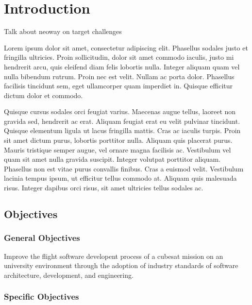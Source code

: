 \chapter{Introduction} \label{cha:introduction}

\fancyhead[ER]{\sffamily\footnotesize{\leftmark}}
\fancyhead[OL]{\sffamily\footnotesize{\rightmark}}

Talk about neoway on target challenges

Lorem ipsum dolor sit amet, consectetur adipiscing elit. Phasellus sodales justo et fringilla ultricies. Proin sollicitudin, dolor sit amet commodo iaculis, justo mi hendrerit arcu, quis eleifend diam felis lobortis nulla. Integer aliquam quam vel nulla bibendum rutrum. Proin nec est velit. Nullam ac porta dolor. Phasellus facilisis tincidunt sem, eget ullamcorper quam imperdiet in. Quisque efficitur dictum dolor et commodo.

Quisque cursus sodales orci feugiat varius. Maecenas augue tellus, laoreet non gravida sed, hendrerit ac erat. Aliquam feugiat erat eu velit pulvinar tincidunt. Quisque elementum ligula ut lacus fringilla mattis. Cras ac iaculis turpis. Proin sit amet dictum purus, lobortis porttitor nulla. Aliquam quis placerat purus. Mauris tristique semper augue, vel ornare magna facilisis ac. Vestibulum vel quam sit amet nulla gravida suscipit. Integer volutpat porttitor aliquam. Phasellus non est vitae purus convallis finibus. Cras a euismod velit. Vestibulum lacinia tempus ipsum, ut efficitur tellus commodo at. Aliquam quis malesuada risus. Integer dapibus orci risus, sit amet ultricies tellus sodales ac. 

\section{Objectives}

\subsection{General Objectives}

Improve the flight software developent process of a cubesat mission on an
university environment through the adoption of industry standards of software
architecture, development, and engineering.

\subsection{Specific Objectives}

